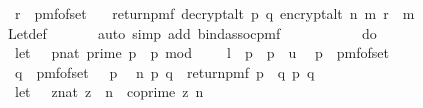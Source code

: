 \begin{isabellebody}
\ \ r\ {\isasymleftarrow}\ pmf{\isacharunderscore}{\kern0pt}of{\isacharunderscore}{\kern0pt}set\ {\isasymZ}{\isacharsemicolon}{\kern0pt}\isanewline
\ \ return{\isacharunderscore}{\kern0pt}pmf\ {\isacharparenleft}{\kern0pt}decrypt{\isacharunderscore}{\kern0pt}alt\ p\ q\ {\isacharparenleft}{\kern0pt}encrypt{\isacharunderscore}{\kern0pt}alt\ n\ m\ r{\isacharparenright}{\kern0pt}\ {\isacharequal}{\kern0pt}\ m{\isacharparenright}{\kern0pt}{\isacharbraceright}{\kern0pt}{\isachardoublequoteclose}\ \isanewline
\ \ \ \ \isamarkupfalse%
\ Let{\isacharunderscore}{\kern0pt}def\ \isanewline
\ \ \ \ \isamarkupfalse%
\ {\isacharparenleft}{\kern0pt}auto\ simp\ add{\isacharcolon}{\kern0pt}\ bind{\isacharunderscore}{\kern0pt}assoc{\isacharunderscore}{\kern0pt}pmf{\isacharparenright}{\kern0pt}\isanewline
\isanewline
\ \ \isamarkupfalse%
\ \isamarkupfalse%
\ {\isachardoublequoteopen}{\isachardot}{\kern0pt}{\isachardot}{\kern0pt}{\isachardot}{\kern0pt}\ {\isacharequal}{\kern0pt}\ \isanewline
\ \ \ do\ {\isacharbraceleft}{\kern0pt}\isanewline
\ \ let\ {\isasymK}\ {\isacharequal}{\kern0pt}\ {\isacharbraceleft}{\kern0pt}{\isacharparenleft}{\kern0pt}p{\isacharcolon}{\kern0pt}{\isacharcolon}{\kern0pt}nat{\isacharparenright}{\kern0pt}{\isachardot}{\kern0pt}\ prime\ p\ {\isasymand}\ p\ mod\ {}\ {\isacharequal}{\kern0pt}\ {}\ {\isasymand}\ l\ {\isasymle}\ p\ {\isasymand}\ p\ {\isasymle}\ u{\isacharbraceright}{\kern0pt}{\isacharsemicolon}{\kern0pt}\isanewline
\ \ p\ {\isasymleftarrow}\ pmf{\isacharunderscore}{\kern0pt}of{\isacharunderscore}{\kern0pt}set\ {\isasymK}{\isacharsemicolon}{\kern0pt}\ \isanewline
\ \ q\ {\isasymleftarrow}\ pmf{\isacharunderscore}{\kern0pt}of{\isacharunderscore}{\kern0pt}set\ {\isacharparenleft}{\kern0pt}{\isasymK}\ {\isacharminus}{\kern0pt}\ {\isacharbraceleft}{\kern0pt}p{\isacharbraceright}{\kern0pt}{\isacharparenright}{\kern0pt}{\isacharsemicolon}{\kern0pt}\isanewline
\ \ {\isacharparenleft}{\kern0pt}n{\isacharcomma}{\kern0pt}\ {\isacharparenleft}{\kern0pt}p{\isacharcomma}{\kern0pt}\ q{\isacharparenright}{\kern0pt}{\isacharparenright}{\kern0pt}\ {\isasymleftarrow}\ return{\isacharunderscore}{\kern0pt}pmf\ {\isacharparenleft}{\kern0pt}{\isacharparenleft}{\kern0pt}p\ {\isacharasterisk}{\kern0pt}\ q{\isacharcomma}{\kern0pt}\ {\isacharparenleft}{\kern0pt}p{\isacharcomma}{\kern0pt}\ q{\isacharparenright}{\kern0pt}{\isacharparenright}{\kern0pt}{\isacharparenright}{\kern0pt}{\isacharsemicolon}{\kern0pt}\isanewline
\ \ let\ {\isasymZ}\ {\isacharequal}{\kern0pt}\ {\isacharbraceleft}{\kern0pt}{\isacharparenleft}{\kern0pt}z{\isacharcolon}{\kern0pt}{\isacharcolon}{\kern0pt}nat{\isacharparenright}{\kern0pt}{\isachardot}{\kern0pt}\ z\ {\isacharless}{\kern0pt}\ n\ {\isasymand}\ coprime\ z\ n{\isacharbraceright}{\kern0pt}{\isacharsemicolon}{\kern0pt}\isanewline

\end{isabellebody}
